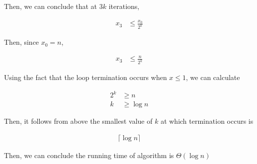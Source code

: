 \documentclass[12pt]{article}
\begin{document}
\begin{enumerate}[a.]
    \bigskip

    Then, we can conclude that at $3k$ iterations,

    \begin{align}
        x_3 &\leq \frac{x_0}{2^k}
    \end{align}

    \bigskip

    Then, since $x_0 = n$,

    \begin{align}
        x_3 &\leq \frac{n}{2^k}
    \end{align}

    \bigskip

    Using the fact that the loop termination occurs when $x \leq 1$, we can
    calculate

    \begin{align}
        2^k &\geq n\\
        k &\geq \log n
    \end{align}

    \bigskip

    Then, it follows from above the smallest value of $k$ at which termination occurs
    is

    \begin{align}
        \lceil \log n \rceil
    \end{align}

    \bigskip

    Then, we can conclude the running time of algorithm is $\Theta (\log n)$


\end{enumerate}
\end{document}
